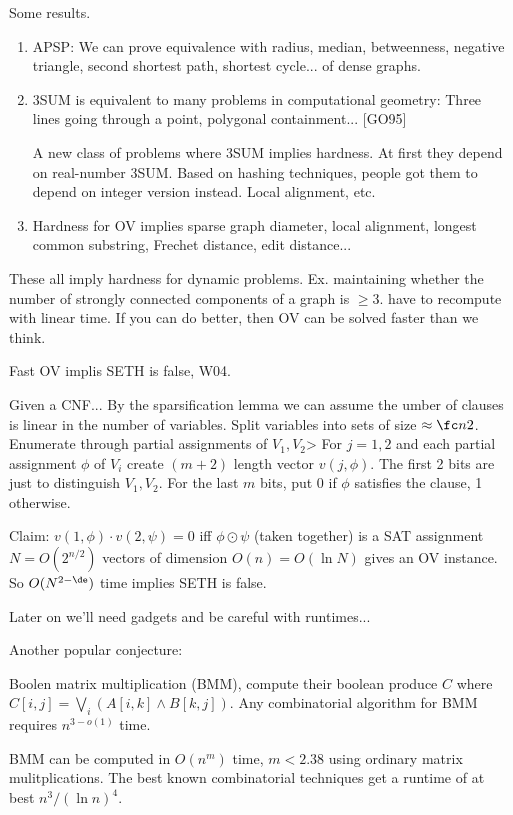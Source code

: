 Some results. 

\begin{enumerate}
\item
APSP: We can prove equivalence with 
radius, median, betweenness, negative triangle, second shortest path, shortest cycle... of dense graphs.
\item
3SUM is equivalent to many problems in computational geometry: 
Three lines going through a point, polygonal containment... [GO95]

A new class of problems where 3SUM implies hardness.
At first they depend on real-number 3SUM. Based on hashing techniques, people got them to depend on integer version instead. Local alignment, etc.
\item
Hardness for OV implies sparse graph diameter, local alignment, longest common substring, Frechet distance, edit distance...
\end{enumerate}
These all imply hardness for dynamic problems. Ex. maintaining whether the number of strongly connected components of a graph is $\ge 3$.
have to recompute with linear time. If you can do better, then OV can be solved faster than we think.

\begin{thm}Fast OV implis SETH is false, W04.
\end{thm}

Given a CNF...
By the sparsification lemma we can assume the umber of clauses is linear in the number of variables. 
Split variables into sets of size $\approx \fc n2$. Enumerate through partial assignments of $V_1,V_2$> 
For $j=1,2$ and each partial assignment $\phi$ of $V_i$ create $(m+2)$ length vector $v(j,\phi)$. The first 2 bits are just to distinguish $V_1,V_2$. For the last $m$ bits, put 0 if $\phi$ satisfies the clause, 1 otherwise. 

Claim: $v(1,\phi)\cdot v(2,\psi)=0$ iff $\phi\odot \psi$ (taken together) is a SAT assignment
$N=O(2^{n/2})$ vectors of dimension $O(n)=O(\ln N)$ gives an OV instance. So $O(N^{2-\de})$ time implies SETH is false.

Later on we'll need gadgets and be careful with runtimes...

Another popular conjecture: 
\begin{conj}
Boolen matrix multiplication (BMM), compute their boolean produce $C$ where $C[i,j]=\bigvee_i (A[i,k] \wedge B[k,j])$. Any combinatorial algorithm for BMM requires $n^{3-o(1)}$ time.
\end{conj}
BMM can be computed in $O(n^m)$ time, $m<2.38$ using ordinary matrix mulitplications. The best known combinatorial techniques get a runtime of at best $n^3/(\ln n)^4$. 

